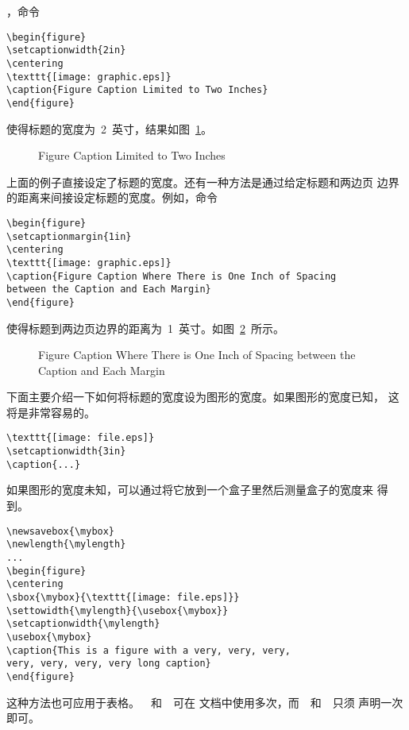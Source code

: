 ，命令
\begin{Verbatim}[xleftmargin=1cm]
\begin{figure} 
\setcaptionwidth{2in} 
\centering 
\texttt{[image: graphic.eps]} 
\caption{Figure Caption Limited to Two Inches} 
\end{figure}
\end{Verbatim}
使得标题的宽度为~2~英寸，结果如图~\ref{fig:twoinwidth}。

\begin{figure} 
	\setcaptionwidth{2in}
	\centering 
	\resizebox{2in}{!}{\usebox{\graphic}}
	\caption{Figure Caption Limited to Two Inches}\label{fig:twoinwidth}
\end{figure}

上面的例子直接设定了标题的宽度。还有一种方法是通过给定标题和两边页
边界的距离来间接设定标题的宽度。例如，命令
\begin{Verbatim}[xleftmargin=1cm]
\begin{figure}
\setcaptionmargin{1in} 
\centering
\texttt{[image: graphic.eps]}
\caption{Figure Caption Where There is One Inch of Spacing 
between the Caption and Each Margin} 
\end{figure}
\end{Verbatim}
使得标题到两边页边界的距离为~1~英寸。如图~\ref{fig:setcapmargin}~所示。

\begin{figure}
	\setcaptionmargin{1in}
	\centering
	\resizebox{2in}{!}{\usebox{\graphic}}
	\caption{Figure Caption Where There is One Inch of Spacing 
		between the Caption and Each Margin}\label{fig:setcapmargin}
\end{figure}

下面主要介绍一下如何将标题的宽度设为图形的宽度。如果图形的宽度已知，
这将是非常容易的。
\begin{Verbatim}[xleftmargin=1cm]
\texttt{[image: file.eps]} 
\setcaptionwidth{3in} 
\caption{...}
\end{Verbatim}
如果图形的宽度未知，可以通过将它放到一个盒子里然后测量盒子的宽度来
得到。
\begin{Verbatim}[xleftmargin=1cm]
\newsavebox{\mybox} 
\newlength{\mylength} 
... 
\begin{figure} 
\centering 
\sbox{\mybox}{\texttt{[image: file.eps]}} 
\settowidth{\mylength}{\usebox{\mybox}} 
\setcaptionwidth{\mylength} 
\usebox{\mybox} 
\caption{This is a figure with a very, very, very, 
very, very, very, very long caption} 
\end{figure}
\end{Verbatim}
这种方法也可应用于表格。~~和~~可在
文档中使用多次，而~~和~~只须
声明一次即可。

